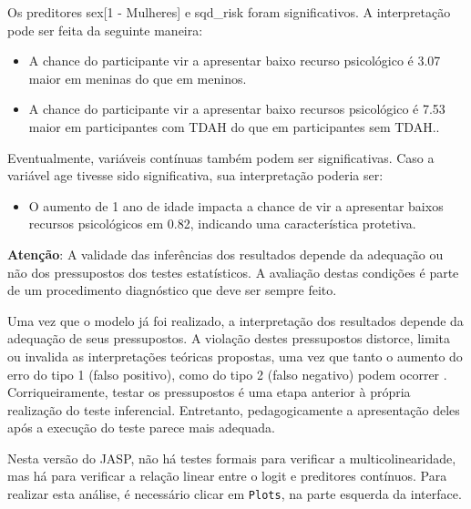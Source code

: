 \documentclass[
]{book}
\providecommand{\tightlist}{%
  \setlength{\itemsep}{0pt}\setlength{\parskip}{0pt}}
\begin{document}
Os preditores sex{[}1 - Mulheres{]} e sqd\_risk foram significativos. A interpretação pode ser feita da seguinte maneira:

\begin{itemize}
\tightlist
\item
  A chance do participante vir a apresentar baixo recurso psicológico é 3.07 maior em meninas do que em meninos.
\item
  A chance do participante vir a apresentar baixo recursos psicológico é 7.53 maior em participantes com TDAH do que em participantes sem TDAH..
\end{itemize}

Eventualmente, variáveis contínuas também podem ser significativas. Caso a variável age tivesse sido significativa, sua interpretação poderia ser:

\begin{itemize}
\tightlist
\item
  O aumento de 1 ano de idade impacta a chance de vir a apresentar baixos recursos psicológicos em 0.82, indicando uma característica protetiva.
\end{itemize}

\begin{warning}

\textbf{Atenção}: A validade das inferências dos resultados depende da adequação ou não dos pressupostos dos testes estatísticos. A avaliação destas condições é parte de um procedimento diagnóstico que deve ser sempre feito.

\end{warning}

Uma vez que o modelo já foi realizado, a interpretação dos resultados depende da adequação de seus pressupostos. A violação destes pressupostos distorce, limita ou invalida as interpretações teóricas propostas, uma vez que tanto o aumento do erro do tipo 1 (falso positivo), como do tipo 2 (falso negativo) podem ocorrer \citep{Lix1996, Barker2015, Ernst2017}. Corriqueiramente, testar os pressupostos é uma etapa anterior à própria realização do teste inferencial. Entretanto, pedagogicamente a apresentação deles após a execução do teste parece mais adequada.

Nesta versão do JASP, não há testes formais para verificar a multicolinearidade, mas há para verificar a relação linear entre o logit e preditores contínuos. Para realizar esta análise, é necessário clicar em \texttt{Plots}, na parte esquerda da interface.
\end{document}

